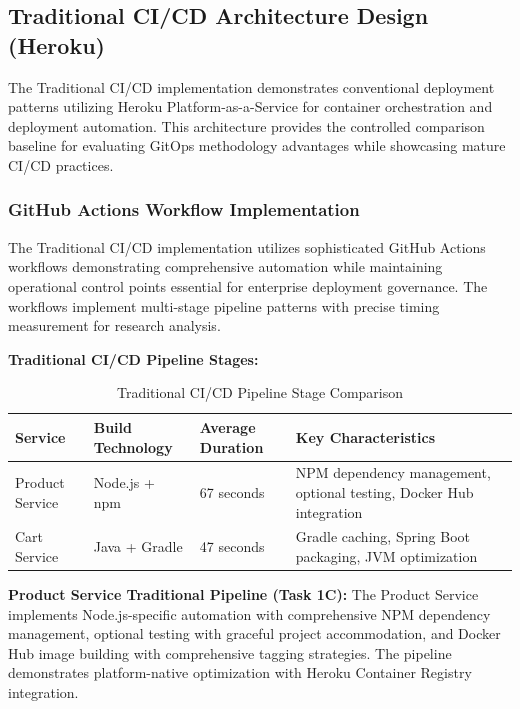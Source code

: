 \subsection{Traditional CI/CD Architecture Design (Heroku)}

The Traditional CI/CD implementation demonstrates conventional deployment patterns utilizing Heroku Platform-as-a-Service for container orchestration and deployment automation. This architecture provides the controlled comparison baseline for evaluating GitOps methodology advantages while showcasing mature CI/CD practices.

\subsubsection{GitHub Actions Workflow Implementation}

The Traditional CI/CD implementation utilizes sophisticated GitHub Actions workflows demonstrating comprehensive automation while maintaining operational control points essential for enterprise deployment governance. The workflows implement multi-stage pipeline patterns with precise timing measurement for research analysis.

\textbf{Traditional CI/CD Pipeline Stages:}

\begin{table}[H]
\centering
\caption{Traditional CI/CD Pipeline Stage Comparison}
\label{tab:traditional-pipeline-stages}
\begin{tabular}{|p{3cm}|p{3cm}|p{3cm}|p{5cm}|}
\hline
\textbf{Service} & \textbf{Build Technology} & \textbf{Average Duration} & \textbf{Key Characteristics} \\
\hline
Product Service & Node.js + npm & 67 seconds & NPM dependency management, optional testing, Docker Hub integration \\
\hline
Cart Service & Java + Gradle & 47 seconds & Gradle caching, Spring Boot packaging, JVM optimization \\
\hline
\end{tabular}
\end{table}

\textbf{Product Service Traditional Pipeline (Task 1C):}
The Product Service implements Node.js-specific automation with comprehensive NPM dependency management, optional testing with graceful project accommodation, and Docker Hub image building with comprehensive tagging strategies. The pipeline demonstrates platform-native optimization with Heroku Container Registry integration.

